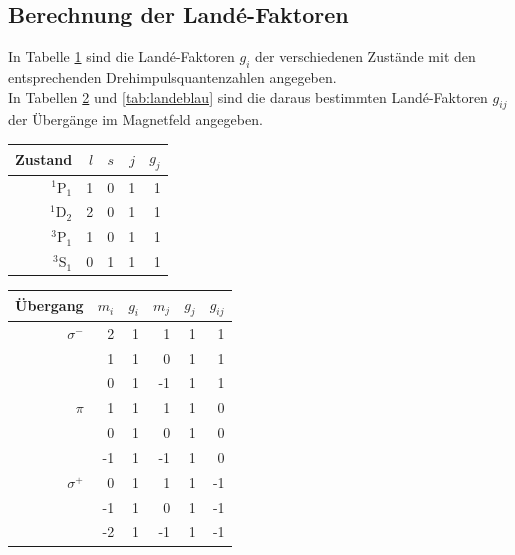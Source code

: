 \documentclass[captions=tableheading]{scrartcl}
\begin{document}
\subsection{Berechnung der Landé-Faktoren}
In Tabelle \ref{tab:landedrehimpuls} sind die Landé-Faktoren $g_i$ der verschiedenen Zustände mit den entsprechenden Drehimpulsquantenzahlen angegeben. \\
In Tabellen \ref{tab:landerot} und \ref{tab:landeblau} sind die daraus bestimmten Landé-Faktoren $g_{ij}$ der Übergänge im Magnetfeld angegeben.

\begin{table}[H]
	\centering
	\label{tab:landedrehimpuls}
	\begin{tabular}{r r r r r}
		\toprule
		Zustand & $l$ & $s$ & $j$ & $g_j$ \\
		\midrule
		$^1$P$_1$ & 1 & 0 & 1 & 1 \\
		$^1$D$_2$ & 2 & 0 & 1 & 1 \\
		$^3$P$_1$ & 1 & 0 & 1 & 1 \\
		$^3$S$_1$ & 0 & 1 & 1 & 1 \\
		\bottomrule	
	\end{tabular}
\end{table}

\begin{table}[H]
	\centering
	\label{tab:landerot}
	\begin{tabular}{r r r r r r}
		\toprule
		Übergang & $m_i$ & $g_i$ & $m_j$ & $g_j$ & $g_{ij}$ \\
		\midrule
		$\sigma^-$ & 2 & 1 & 1 & 1 & 1 \\
				   & 1 & 1 & 0 & 1 & 1 \\
				   & 0 & 1 & -1 & 1 &1 \\
		$\pi$	   & 1 & 1 & 1 & 1 & 0 \\
				   & 0 & 1 & 0 & 1 & 0 \\
				   & -1 & 1 & -1 & 1 & 0 \\
		$\sigma^+$ & 0 & 1 & 1 & 1 & -1 \\
				   & -1 & 1 & 0 & 1 & -1 \\
				   & -2 & 1 & -1 & 1 & -1 \\
		\bottomrule	
	\end{tabular}
\end{table}
\end{document}
